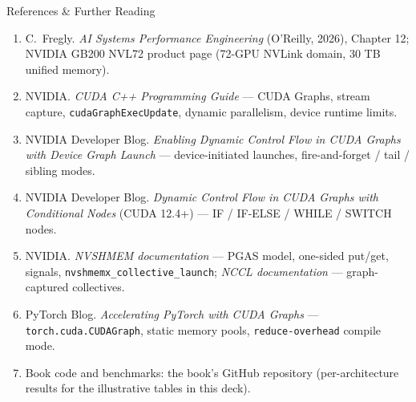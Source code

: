 \documentclass[aspectratio=169]{beamer}
\begin{document}
\begin{frame}{References \& Further Reading}
  {\footnotesize
  \begin{enumerate}
    \item C.\ Fregly. \emph{AI Systems Performance Engineering} (O'Reilly, 2026), Chapter 12;
          NVIDIA GB200 NVL72 product page (72-GPU NVLink domain, 30 TB unified memory).
    \item NVIDIA. \emph{CUDA C++ Programming Guide} --- CUDA Graphs, stream capture,
          \texttt{cudaGraphExecUpdate}, dynamic parallelism, device runtime limits.
    \item NVIDIA Developer Blog. \emph{Enabling Dynamic Control Flow in CUDA Graphs with
          Device Graph Launch} --- device-initiated launches, fire-and-forget / tail / sibling modes.
    \item NVIDIA Developer Blog. \emph{Dynamic Control Flow in CUDA Graphs with Conditional Nodes}
          (CUDA 12.4+) --- IF / IF-ELSE / WHILE / SWITCH nodes.
    \item NVIDIA. \emph{NVSHMEM documentation} --- PGAS model, one-sided put/get, signals,
          \texttt{nvshmemx\_collective\_launch}; \emph{NCCL documentation} --- graph-captured collectives.
    \item PyTorch Blog. \emph{Accelerating PyTorch with CUDA Graphs} ---
          \texttt{torch.cuda.CUDAGraph}, static memory pools, \texttt{reduce-overhead} compile mode.
    \item Book code and benchmarks: the book's GitHub repository (per-architecture results for the
          illustrative tables in this deck).
  \end{enumerate}}
\end{frame}
\end{document}
